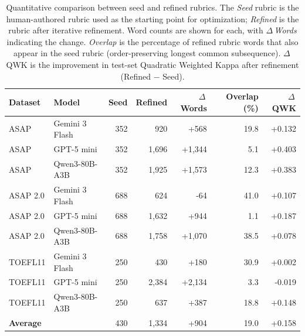 \begin{table}[t]
\centering
\begin{tabular}{ll rrr r r}
\toprule
Dataset & Model & Seed & Refined & $\Delta$\,Words & Overlap (\%) & $\Delta$\,QWK \\
\midrule
  ASAP & Gemini 3 Flash & 352 & 920 & +568 & 19.8 & +0.132 \\
  ASAP & GPT-5 mini & 352 & 1,696 & +1,344 & 5.1 & +0.403 \\
  ASAP & Qwen3-80B-A3B & 352 & 1,925 & +1,573 & 12.3 & +0.383 \\
\midrule
  ASAP 2.0 & Gemini 3 Flash & 688 & 624 & -64 & 41.0 & +0.107 \\
  ASAP 2.0 & GPT-5 mini & 688 & 1,632 & +944 & 1.1 & +0.187 \\
  ASAP 2.0 & Qwen3-80B-A3B & 688 & 1,758 & +1,070 & 38.5 & +0.078 \\
\midrule
  TOEFL11 & Gemini 3 Flash & 250 & 430 & +180 & 30.9 & +0.002 \\
  TOEFL11 & GPT-5 mini & 250 & 2,384 & +2,134 & 3.3 & -0.019 \\
  TOEFL11 & Qwen3-80B-A3B & 250 & 637 & +387 & 18.8 & +0.148 \\
\midrule
  \multicolumn{2}{l}{\textbf{Average}} & 430 & 1,334 & +904 & 19.0 & +0.158 \\
\bottomrule
\end{tabular}
\caption{Quantitative comparison between seed and refined rubrics. The \textit{Seed} rubric is the human-authored rubric used as the starting point for optimization; \textit{Refined} is the rubric after iterative refinement. Word counts are shown for each, with \textit{$\Delta$\,Words} indicating the change. \textit{Overlap} is the percentage of refined rubric words that also appear in the seed rubric (order-preserving longest common subsequence). $\Delta$\,QWK is the improvement in test-set Quadratic Weighted Kappa after refinement (Refined $-$ Seed).}
\label{tab:rubric_comparison}
\end{table}